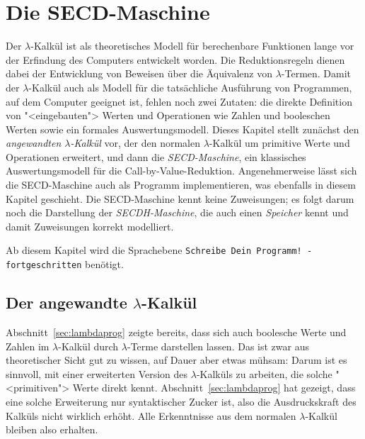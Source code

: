
\chapter{Die SECD-Maschine}\label{cha:secd}

Der $\lambda$-Kalkül ist als theoretisches Modell für berechenbare
Funktionen lange vor der Erfindung des Computers entwickelt worden.
Die Reduktionsregeln dienen dabei der Entwicklung von Beweisen über
die Äquivalenz von $\lambda$-Termen.  Damit der $\lambda$-Kalkül auch
als Modell für die tatsächliche Ausführung von Programmen, auf dem
Computer geeignet ist, fehlen noch zwei Zutaten: die direkte
Definition von "<eingebauten"> Werten und Operationen wie Zahlen und
booleschen Werten sowie ein formales Auswertungsmodell.  Dieses
Kapitel stellt zunächst den \textit{angewandten $\lambda$-Kalkül} vor,
der den normalen $\lambda$-Kalkül um primitive Werte und Operationen
erweitert, und dann die \textit{SECD-Maschine}, ein klassisches
Auswertungsmodell für die Call-by-Value-Reduktion.  Angenehmerweise
lässt sich die SECD-Maschine auch als Programm implementieren,
was ebenfalls in diesem Kapitel geschieht.  Die SECD-Maschine
kennt keine Zuweisungen; es folgt darum noch die Darstellung der
\textit{SECDH-Maschine}, die auch einen \textit{Speicher} kennt und
damit Zuweisungen korrekt modelliert.

Ab diesem Kapitel wird die Sprachebene \texttt{Schreibe
  Dein Programm! - fortgeschritten} benötigt. 

\section{Der angewandte $\lambda$-Kalkül}

Abschnitt~\ref{sec:lambdaprog} zeigte bereits, dass sich auch boolesche
Werte und Zahlen im $\lambda$-Kalkül durch $\lambda$-Terme darstellen
lassen.  Das ist zwar aus theoretischer Sicht gut zu wissen, auf Dauer
aber etwas mühsam: Darum ist es sinnvoll, mit einer erweiterten
Version des $\lambda$-Kalküls zu arbeiten, die solche "<primitiven">
Werte direkt kennt.  Abschnitt~\ref{sec:lambdaprog} hat gezeigt,
dass eine solche Erweiterung nur syntaktischer Zucker ist,
also die Ausdruckskraft des Kalküls nicht wirklich erhöht.  Alle
Erkenntnisse aus dem normalen $\lambda$-Kalkül bleiben also erhalten.

